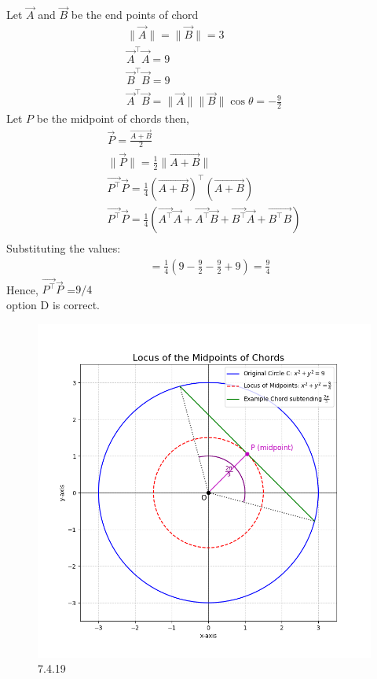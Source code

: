 \documentclass[journal]{IEEEtran}
\begin{document}
Let $\vec{A}$ and $\vec{B}$ be the end points of chord 
\begin{align}
\|\vec{A}\| = \|\vec{B}\| = 3 \\
\vec{A}^\top \vec{A} = 9 \\
\vec{B}^\top \vec{B} = 9 \\
\vec{A}^\top \vec{B} = \|\vec{A}\| \|\vec{B}\| \cos\theta = -\frac{9}{2} 
\end{align}
Let $P$ be the midpoint of chords then, 
\begin{align}
\vec{P} = \frac{\vec{A + B}}{2} \\
\|\vec{P}\| = \frac{1}{2} \|\vec{A + B}\| \\
\vec{P^\top} \vec{P} = \frac{1}{4} (\vec{A+B})^\top (\vec{A+B}) \\
\vec{P^\top} \vec{P} = \frac{1}{4} (\vec{A^\top} \vec{A} + \vec{A^\top} \vec{B} + \vec{B^\top} \vec{A} + \vec{B^\top B})\\
\end{align}
Substituting the values:
\begin{align}
\quad = \frac{1}{4} \left(9 - \frac{9}{2} - \frac{9}{2} + 9\right) = \frac{9}{4}
\end{align}
Hence, $\vec{P^\top} \vec{P}$ =${9}/{4}$\\
option {D} is correct.
\begin{figure}[H]
    \centering
    \includegraphics[width=0.85\columnwidth]{figs/graph14.png}
    \caption{7.4.19}
    \label{fig:placeholder}
\end{figure}
\end{document}
